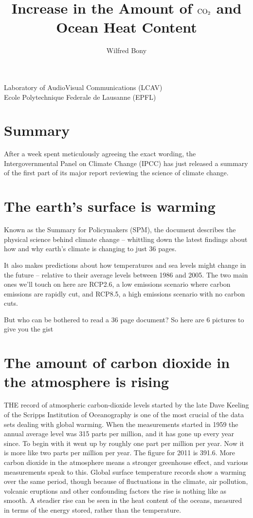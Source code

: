 \documentclass[11pt,1column]{article}
\begin{document}
\title{Increase in the Amount of $\hbox{CO}_2$ and Ocean Heat Content}
\author{Wilfred Bony}


\date{}
\maketitle

\begin{center}
Laboratory of AudioVisual Communications (LCAV)\\
Ecole Polytechnique Federale de Lausanne (EPFL)
\end{center}


\section{Summary}
After a week spent meticulously agreeing the exact wording, the Intergovernmental Panel on Climate Change (IPCC) has just released a summary of the first part of its major report reviewing the science of climate change.

\section{The earth’s surface is warming}
Known as the Summary for Policymakers (SPM), the document describes the physical science behind climate change – whittling down the latest findings about how and why earth’s climate is changing to just 36 pages.

It also makes predictions about how temperatures and sea levels might change in the future – relative to their average levels between 1986 and 2005. The two main ones we’ll touch on here are RCP2.6, a low emissions scenario where carbon emissions are rapidly cut, and RCP8.5, a high emissions scenario with no carbon cuts.

But who can be bothered to read a 36 page document? So here are 6 pictures to give you the gist


\section{The amount of carbon dioxide in the atmosphere is rising}
THE record of atmospheric carbon-dioxide levels started by the late Dave Keeling of the Scripps Institution of Oceanography is one of the most crucial of the data sets dealing with global warming. When the measurements started in 1959 the annual average level was 315 parts per million, and it has gone up every year since. To begin with it went up by roughly one part per million per year. Now it is more like two parts per million per year. The figure for 2011 is 391.6. More carbon dioxide in the atmosphere means a stronger greenhouse effect, and various measurements speak to this. Global surface temperature records show a warming over the same period, though because of fluctuations in the climate, air pollution, volcanic eruptions and other confounding factors the rise is nothing like as smooth. A steadier rise can be seen in the heat content of the oceans, measured in terms of the energy stored, rather than the temperature.
\end{document}
